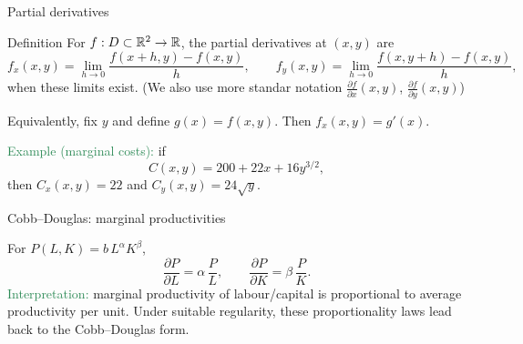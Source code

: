 \documentclass[11pt,aspectratio=169]{beamer}
\begin{document}
\begin{frame}{Partial derivatives}
\begin{block}{Definition}
For \(f:D\subset\mathbb R^2\to\mathbb R\), the partial derivatives at \((x,y)\) are
\[
f_x(x,y)=\lim_{h\to 0}\frac{f(x+h,y)-f(x,y)}{h},\qquad
f_y(x,y)=\lim_{h\to 0}\frac{f(x,y+h)-f(x,y)}{h},
\]
when these limits exist.	 (We also use more standar notation $\frac{\partial f}{\partial x}(x,y)$, $\frac{\partial f}{\partial y}(x,y)$)
\end{block}
\begin{alertblock}{}
	Equivalently, fix $y$ and define $g(x)=f(x,y)$. Then $f_x(x,y)=g'(x)$.
\end{alertblock}

\textcolor{SeaGreen}{Example (marginal costs):} if
\[
C(x,y)=200+22x+16y^{3/2},
\]
then \(C_x(x,y)=22\) and \(C_y(x,y)=24\sqrt{y}\).

\end{frame}

\begin{frame}{Cobb--Douglas: marginal productivities}

For \(P(L,K)=b\,L^{\alpha}K^{\beta}\),
\[
\frac{\partial P}{\partial L}=\alpha\,\frac{P}{L},\qquad
\frac{\partial P}{\partial K}=\beta\,\frac{P}{K}.
\]
\textcolor{SeaGreen}{Interpretation:} marginal productivity of labour/capital is proportional to average productivity per unit.
{\footnotesize Under suitable regularity, these proportionality laws lead back to the Cobb--Douglas form.}

\end{frame}
\end{document}
